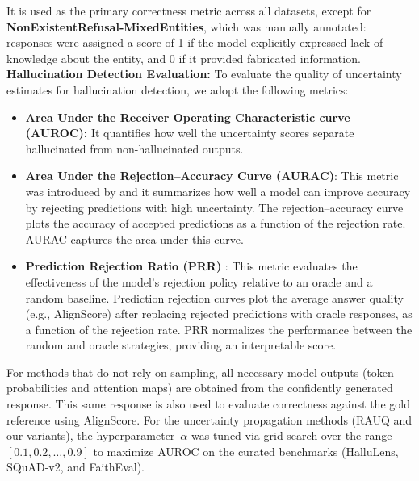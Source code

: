\documentclass[letterpaper]{article} %
\begin{document}
It is used as the primary correctness metric across all datasets, except for \textbf{NonExistentRefusal‑MixedEntities}, which was manually annotated: responses were assigned a score of 1 if the model explicitly expressed lack of knowledge about the entity, and 0 if it provided fabricated information.\\
\textbf{Hallucination Detection Evaluation:}
To evaluate the quality of uncertainty estimates for hallucination detection, we adopt the following metrics:

\begin{itemize}
    \item \textbf{Area Under the Receiver Operating Characteristic curve (AUROC):} It quantifies how well the uncertainty scores separate hallucinated from non-hallucinated outputs.

    \item \textbf{Area Under the Rejection–Accuracy Curve (AURAC)}: 
    This metric was introduced by \citet{kuhn2023semanticuncertaintylinguisticinvariances} and it summarizes how well a model can improve accuracy by rejecting predictions with high uncertainty. The rejection–accuracy curve plots the accuracy of accepted predictions as a function of the rejection rate. AURAC captures the area under this curve.

    \item \textbf{Prediction Rejection Ratio (PRR)} \cite{malinin2021uncertainty}: 
    This metric evaluates the effectiveness of the model's rejection policy relative to an oracle and a random baseline. Prediction rejection curves plot the average answer quality (e.g., AlignScore) after replacing rejected predictions with oracle responses, as a function of the rejection rate. PRR normalizes the performance between the random and oracle strategies, providing an interpretable score.
\end{itemize}

For methods that do not rely on sampling, all necessary model outputs (token probabilities and attention maps) are obtained from the confidently generated response. This same response is also used to evaluate correctness against the gold reference using AlignScore.
For the uncertainty propagation methods (RAUQ and our variants), the hyperparameter~$\alpha$ was tuned via grid search over the range $[0.1, 0.2, \dots, 0.9]$ to maximize AUROC on the curated benchmarks (HalluLens, SQuAD-v2, and FaithEval).
\end{document}
